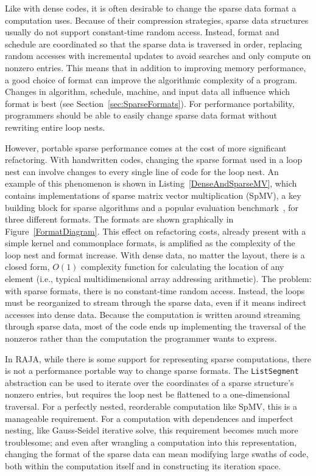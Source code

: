 Like with dense codes, it is often desirable to change the sparse data format a computation uses.
Because of their compression strategies, sparse data structures usually do not support constant-time random access.
Instead, format and schedule are coordinated so that the sparse data is traversed in order, replacing random accesses with incremental updates to avoid searches and only compute on nonzero entries.
This means that in addition to improving memory performance, a good choice of format can improve the algorithmic complexity of a program.
Changes in algorithm, schedule, machine, and input data all influence which format is best (see Section~\ref{sec:SparseFormats}).
For performance portability, programmers should be able to easily change sparse data format without rewriting entire loop nests.


However, portable sparse performance comes at the cost of more significant refactoring.
With handwritten codes, changing the sparse format used in a loop nest can involve changes to every single line of code for the loop nest.
An example of this phenomenon is shown in Listing~\ref{DenseAndSparseMV}, which contains implementations of sparse matrix vector multiplication (SpMV), a key building block for sparse algorithms and a popular evaluation benchmark~\cite{bell2009implementing,buluc2009parallel,liu2013efficient,langr2015evaluation}, for three different formats.
The formats are shown graphically in Figure~\ref{FormatDiagram}.
This effect on refactoring costs, already present with a simple kernel and commonplace formats, is amplified as the complexity of the loop nest and format increase.
With dense data, no matter the layout, there is a closed form, $O(1)$ complexity function for calculating the location of any element (i.e., typical multidimensional array addressing arithmetic).
The problem: with sparse formats, there is no constant-time random access.
Instead, the loops must be reorganized to stream through the sparse data, even if it means indirect accesses into dense data.
Because the computation is written around streaming through sparse data, most of the code ends up implementing the traversal of the nonzeros rather than the computation the programmer wants to express.


  
In RAJA, while there is some support for representing sparse computations, there is not a performance portable way to change sparse formats.
The \verb.ListSegment. abstraction can be used to iterate over the coordinates of a sparse structure's nonzero entries, but requires the loop nest be flattened to a one-dimensional traversal.
For a perfectly nested, reorderable computation like SpMV, this is a manageable requirement.
For a computation with dependences and imperfect nesting, like Gauss-Seidel iterative solve, this requirement becomes much more troublesome;
and even after wrangling a computation into this representation, changing the format of the sparse data can mean modifying large swaths of code, both within the computation itself and in constructing its iteration space.

